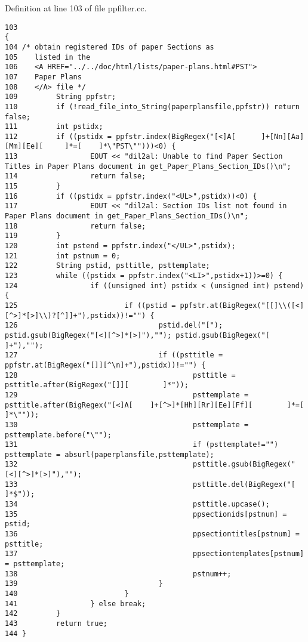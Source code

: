 Definition at line 103 of file ppfilter.cc.



\footnotesize\begin{verbatim}103                                                                                                                            {
104 /* obtain registered IDs of paper Sections as
105    listed in the
106    <A HREF="../../doc/html/lists/paper-plans.html#PST">
107    Paper Plans
108    </A> file */
109         String ppfstr;
110         if (!read_file_into_String(paperplansfile,ppfstr)) return false;
111         int pstidx;
112         if ((pstidx = ppfstr.index(BigRegex("[<]A[      ]+[Nn][Aa][Mm][Ee][     ]*=[    ]*\"PST\"")))<0) {
113                 EOUT << "dil2al: Unable to find Paper Section Titles in Paper Plans document in get_Paper_Plans_Section_IDs()\n";
114                 return false;
115         }
116         if ((pstidx = ppfstr.index("<UL>",pstidx))<0) {
117                 EOUT << "dil2al: Section IDs list not found in Paper Plans document in get_Paper_Plans_Section_IDs()\n";
118                 return false;
119         }
120         int pstend = ppfstr.index("</UL>",pstidx);
121         int pstnum = 0;
122         String pstid, psttitle, psttemplate;
123         while ((pstidx = ppfstr.index("<LI>",pstidx+1))>=0) {
124                 if ((unsigned int) pstidx < (unsigned int) pstend) {
125                         if ((pstid = ppfstr.at(BigRegex("[[]\\([<][^>]*[>]\\)?[^]]+"),pstidx))!="") {
126                                 pstid.del("["); pstid.gsub(BigRegex("[<][^>]*[>]"),""); pstid.gsub(BigRegex("[  ]+"),"");
127                                 if ((psttitle = ppfstr.at(BigRegex("[]][^\n]+"),pstidx))!="") {
128                                         psttitle = psttitle.after(BigRegex("[]][        ]*"));
129                                         psttemplate = psttitle.after(BigRegex("[<]A[    ]+[^>]*[Hh][Rr][Ee][Ff][        ]*=[    ]*\""));
130                                         psttemplate = psttemplate.before("\"");
131                                         if (psttemplate!="") psttemplate = absurl(paperplansfile,psttemplate);
132                                         psttitle.gsub(BigRegex("[<][^>]*[>]"),"");
133                                         psttitle.del(BigRegex("[        ]*$"));
134                                         psttitle.upcase();
135                                         ppsectionids[pstnum] = pstid;
136                                         ppsectiontitles[pstnum] = psttitle;
137                                         ppsectiontemplates[pstnum] = psttemplate;
138                                         pstnum++;
139                                 }
140                         }
141                 } else break;
142         }
143         return true;
144 }
\end{verbatim}\normalsize 
{}
